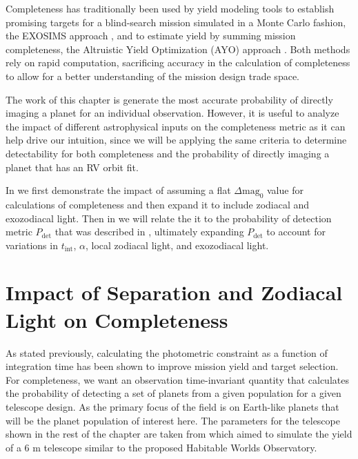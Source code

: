 Completeness has traditionally been used by yield modeling tools to establish
promising targets for a blind-search mission simulated in a Monte Carlo
fashion, the EXOSIMS approach \citep{savranskyEXOSIMSExoplanetOpenSource2017},
and to estimate yield by summing mission completeness, the Altruistic Yield
Optimization (AYO) approach \citep{starkMaximizingExoEarthCandidate2014}. Both
methods rely on rapid computation, sacrificing accuracy in the calculation of
completeness to allow for a better understanding of the mission design trade
space.

The work of this chapter is generate the most accurate probability of directly
imaging a planet for an individual observation. However, it is useful to
analyze the impact of different astrophysical inputs on the completeness metric
as it can help drive our intuition, since we will be applying the same 
criteria to determine detectability for both completeness and the probability
of directly imaging a planet that has an RV orbit fit.

In  we  first demonstrate the impact of
assuming a flat $\Delta\textrm{mag}_0$ value for calculations of completeness
and then expand it to include zodiacal and exozodiacal light. Then in
 we will relate the it to the probability of
detection metric $P_\textrm{det}$ that was described in ,
ultimately expanding $P_\textrm{det}$ to account for variations in $t_\textrm{int}$, $\alpha$,
local zodiacal light, and exozodiacal light.


\section{Impact of Separation and Zodiacal Light on Completeness}
\label{sec:impact_on_completeness}

As stated previously, calculating the photometric constraint as a function of
integration time has been shown to improve mission yield and target selection.
For completeness, we want an observation time-invariant quantity that
calculates the probability of detecting a set of planets from a given
population for a given telescope design. As the primary focus of the field is
on Earth-like planets that will be the planet population of interest here. The
parameters for the telescope shown in the rest of the chapter are taken from
\citet{morganExplorationExpectedNumber2022a} which aimed to simulate the yield
of a 6 m telescope similar to the proposed Habitable Worlds Observatory.

